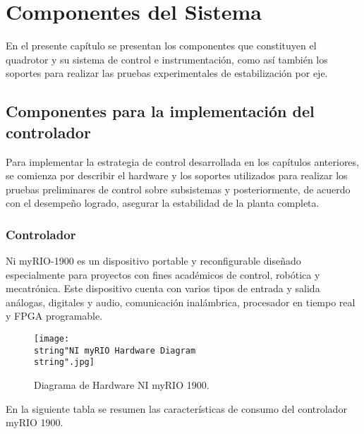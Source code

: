 \documentclass[../main.tex]{subfiles}
\begin{document}
\chapter{Componentes del Sistema}\label{Componentes del Sistema}

En el presente capítulo se presentan los componentes que constituyen el quadrotor y su sistema de control e instrumentación, como así también los soportes para realizar las pruebas experimentales de estabilización por eje.


\section{Componentes para la implementación del controlador}

Para implementar la estrategia de control desarrollada en los capítulos
anteriores, se comienza por describir el hardware y los soportes utilizados
para realizar los pruebas preliminares de control sobre subsistemas
y posteriormente, de acuerdo con el desempeño logrado, asegurar la
estabilidad de la planta completa.


\subsection{Controlador }

Ni myRIO-1900 es un dispositivo portable y reconfigurable diseñado
especialmente para proyectos con fines académicos de control, robótica
y mecatrónica. Este dispositivo cuenta con varios tipos de entrada
y salida análogas, digitales y audio, comunicación inalámbrica, procesador
en tiempo real y FPGA programable. 

\begin{figure}[H]
\noindent \begin{centering}
\texttt{[image: \\string"NI myRIO Hardware Diagram\\string".jpg]}
\par\end{centering}
\caption{Diagrama de Hardware NI myRIO 1900.}
\end{figure}

\textcompwordmark{}

En la siguiente tabla se resumen las características de consumo del
controlador myRIO 1900.
\end{document}
